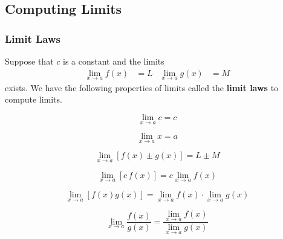 \subsection{Computing Limits}

\subsubsection{Limit Laws}
Suppose that \(c\) is a constant and the limits
\begin{align*}
    \lim_{x\to a}f(x)&=L & \lim_{x\to a}g(x)&=M
\end{align*}
exists.
We have the following properties of limits called the \textbf{limit laws} to
compute limits.
\begin{theorem}
    \[\lim_{x\to a}c=c\]
\end{theorem}
\begin{theorem}
    \[\lim_{x\to a}x=a\]
\end{theorem}
\begin{theorem}
    \[\lim_{x\to a}[f(x)\pm g(x)]=L\pm M\]
\end{theorem}
\begin{theorem}
    \[\lim_{x\to a}[c\,f(x)]=c\lim_{x\to a}f(x)\]
\end{theorem}
\begin{theorem}
    \[\lim_{x\to a}[f(x)g(x)]=\lim_{x\to a}f(x)\cdot\lim_{x\to a}g(x)\]
\end{theorem}
\begin{theorem}
    \[\lim_{x\to a}\frac{f(x)}{g(x)}=\frac{\lim_{x\to a}f(x)}{\lim_{x\to a}g(x)}\]
\end{theorem}